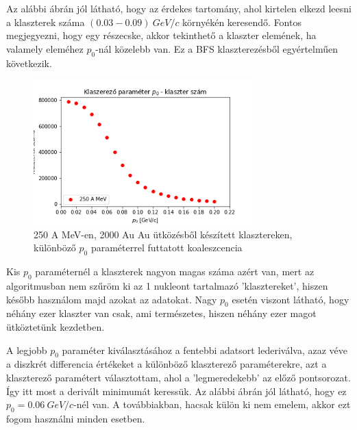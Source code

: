 \documentclass[a4paper,12pt]{article}
\begin{document}
\par Az alábbi ábrán jól látható, hogy az érdekes tartomány, ahol kirtelen elkezd leesni a klaszterek száma $(0.03 - 0.09) ~GeV/c$ környékén keresendő. Fontos megjegyezni, hogy egy részecske, akkor tekinthető a klaszter elemének, ha valamely eleméhez $p_{0}$-nál közelebb van. Ez a BFS klaszterezésből egyértelműen következik. 

\vspace{5mm}

\begin{figure}[!htb]
\centering
\includegraphics[width=0.75\textwidth]{./klaszterszamparameter.png}
\caption{250 A MeV-en, 2000 Au Au ütközésből készített klasztereken, különböző $p_{0}$ paraméterrel futtatott koaleszcencia}
\end{figure}

\vspace{5mm}

\par Kis $p_{0}$ paraméternél a klaszterek nagyon magas száma azért van, mert az algoritmusban nem szűröm ki az 1 nukleont tartalmazó 'klasztereket', hiszen később használom majd azokat az adatokat. Nagy $p_{0}$ esetén viszont látható, hogy néhány ezer klaszter van csak, ami természetes, hiszen néhány ezer magot ütköztetünk kezdetben.

\vspace{5mm}

\par A legjobb $p_{0}$ paraméter kiválasztásához a fentebbi adatsort lederiválva, azaz véve a diszkrét differencia értékeket a különböző klaszterező paraméterekre, azt a klaszterező paramétert választottam, ahol a 'legmeredekebb' az előző pontsorozat. Így itt most a derivált minimumát keressük. Az alábbi ábrán jól látható, hogy ez $p_{0} = 0.06 ~GeV/c$-nél van. A továbbiakban, hacsak külön ki nem emelem, akkor ezt fogom használni minden esetben.
\end{document}
